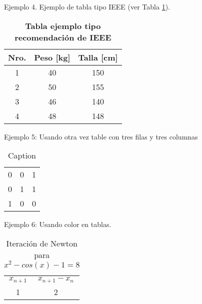 \documentclass{article}
\begin{document}
Ejemplo 4. Ejemplo de tabla tipo IEEE (ver Tabla \ref{tab:03}).

\begin{table}[h]
    \centering
    \begin{tabular}{c c c} \hline
        \textbf{Nro.} & \textbf{Peso [kg]} & \textbf{Talla [cm]} \\ \hline
        1 & 40 & 150 \\ \hline
        2 & 50 & 155 \\ \hline
        3 & 46 & 140 \\ \hline
        4 & 48 & 148 \\ \hline
    \end{tabular}
    \caption{\textbf{Tabla ejemplo tipo recomendación de IEEE}}
    \label{tab:03}
\end{table}

Ejemplo 5: Usando otra vez table con tres filas y tres columnas

\begin{table}[]
    \centering
    \begin{tabular}{|c|c|c|} \hline
        0 & 0 & 1  \\ 
        0 & 1 & 1  \\ \cline{1-2}
        1 & 0 & 0  \\ \hline
    \end{tabular}
    \caption{Caption}
    \label{tab:my_label}
\end{table}

Ejemplo 6: Usando color en tablas.

\begin{table}[h!]
    \centering
    \begin{tabular}{c|c}
       \rowcolor{yellow} $x_{n+1}$  & $x_{n+1} - x_{n}$ \\
         1 & 2 \\ 
    \end{tabular}
    \caption{Iteración de Newton para $x^2-cos(x)-1=8$}
    \label{tab:my_label}
\end{table}
\end{document}

